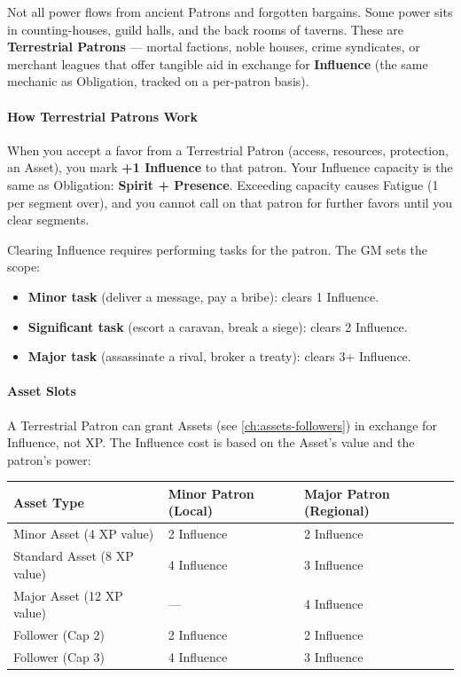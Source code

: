 \begin{tcolorbox}[colback=black!3!white, colframe=black!40!white, title=Terrestrial Patrons --- Mortal Powers That Collect,breakable]
  \label{box:terrestrial-patrons}
  
  Not all power flows from ancient Patrons and forgotten bargains. Some power sits in counting-houses, guild halls, and the back rooms of taverns. These are \textbf{Terrestrial Patrons} --- mortal factions, noble houses, crime syndicates, or merchant leagues that offer tangible aid in exchange for \textbf{Influence} (the same mechanic as Obligation, tracked on a per-patron basis).
  
  \paragraph{How Terrestrial Patrons Work}
  When you accept a favor from a Terrestrial Patron (access, resources, protection, an Asset), you mark \textbf{+1 Influence} to that patron. Your Influence capacity is the same as Obligation: \textbf{Spirit + Presence}. Exceeding capacity causes Fatigue (1 per segment over), and you cannot call on that patron for further favors until you clear segments.
  
  Clearing Influence requires performing tasks for the patron. The GM sets the scope:
  \begin{itemize}
      \item \textbf{Minor task} (deliver a message, pay a bribe): clears 1 Influence.
      \item \textbf{Significant task} (escort a caravan, break a siege): clears 2 Influence.
      \item \textbf{Major task} (assassinate a rival, broker a treaty): clears 3+ Influence.
  \end{itemize}
  
  \paragraph{Asset Slots}
  A Terrestrial Patron can grant Assets (see \ref{ch:assets-followers}) in exchange for Influence, not XP. The Influence cost is based on the Asset's value and the patron's power:
  
  \begin{center}
  \begin{tabular}{lll}
  \toprule
  \textbf{Asset Type} & \textbf{Minor Patron (Local)} & \textbf{Major Patron (Regional)} \\
  \midrule
  Minor Asset (4 XP value) & 2 Influence & 2 Influence \\
  Standard Asset (8 XP value) & 4 Influence & 3 Influence \\
  Major Asset (12 XP value) & --- & 4 Influence \\
  Follower (Cap 2) & 2 Influence & 2 Influence \\
  Follower (Cap 3) & 4 Influence & 3 Influence \\
  \bottomrule
  \end{tabular}
  \end{center}
  

\end{tcolorbox}
